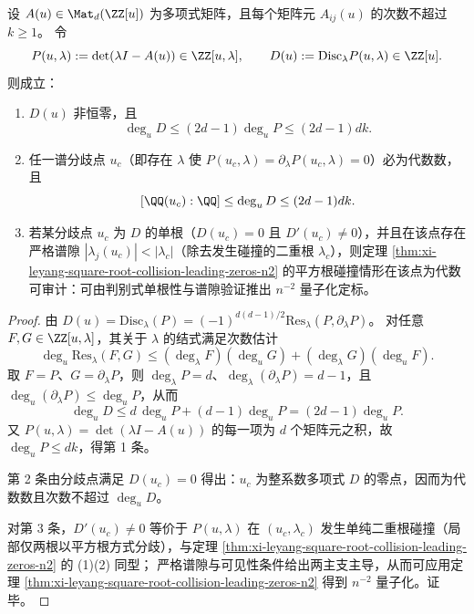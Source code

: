 \begin{theorem}[多项式传递矩阵的临界点代数性与判别式复杂度上界]\label{thm:xi-polynomial-transfer-matrix-branchpoint-discriminant-degree}
设 \(A(u)\in\Mat_d(\ZZ[u])\) 为多项式矩阵，且每个矩阵元 \(A_{ij}(u)\) 的次数不超过 \(k\ge 1\)。
令
\[
P(u,\lambda):=\det(\lambda I-A(u))\in\ZZ[u,\lambda],
\qquad
D(u):=\mathrm{Disc}_\lambda P(u,\lambda)\in\ZZ[u].
\]
则成立：
\begin{enumerate}
  \item \(D(u)\) 非恒零，且
  \[
  \deg_u D\le (2d-1)\deg_u P\le (2d-1)dk.
  \]
  \item 任一谱分歧点 \(u_c\)（即存在 \(\lambda\) 使 \(P(u_c,\lambda)=\partial_\lambda P(u_c,\lambda)=0\)）必为代数数，且
  \[
  [\QQ(u_c):\QQ]\le \deg_u D \le (2d-1)dk.
  \]
  \item 若某分歧点 \(u_c\) 为 \(D\) 的单根（\(D(u_c)=0\) 且 \(D'(u_c)\neq 0\)），并且在该点存在严格谱隙 \(|\lambda_j(u_c)|<|\lambda_c|\)（除去发生碰撞的二重根 \(\lambda_c\)），则定理 \ref{thm:xi-leyang-square-root-collision-leading-zeros-n2} 的平方根碰撞情形在该点为代数可审计：可由判别式单根性与谱隙验证推出 \(n^{-2}\) 量子化定标。
\end{enumerate}
\end{theorem}
\begin{proof}
由 \(D(u)=\mathrm{Disc}_\lambda(P)=(-1)^{d(d-1)/2}\mathrm{Res}_\lambda(P,\partial_\lambda P)\)。
对任意 \(F,G\in\ZZ[u,\lambda]\)，其关于 \(\lambda\) 的结式满足次数估计
\[
\deg_u\mathrm{Res}_\lambda(F,G)
\le (\deg_\lambda F)(\deg_u G)+(\deg_\lambda G)(\deg_u F).
\]
取 \(F=P\)、\(G=\partial_\lambda P\)，则 \(\deg_\lambda P=d\)、\(\deg_\lambda(\partial_\lambda P)=d-1\)，且 \(\deg_u(\partial_\lambda P)\le \deg_u P\)，从而
\[
\deg_u D\le d\,\deg_u P+(d-1)\deg_u P=(2d-1)\deg_u P.
\]
又 \(P(u,\lambda)=\det(\lambda I-A(u))\) 的每一项为 \(d\) 个矩阵元之积，故 \(\deg_u P\le dk\)，得第 1 条。

第 2 条由分歧点满足 \(D(u_c)=0\) 得出：\(u_c\) 为整系数多项式 \(D\) 的零点，因而为代数数且次数不超过 \(\deg_u D\)。

对第 3 条，\(D'(u_c)\neq 0\) 等价于 \(P(u,\lambda)\) 在 \((u_c,\lambda_c)\) 发生单纯二重根碰撞（局部仅两根以平方根方式分歧），与定理 \ref{thm:xi-leyang-square-root-collision-leading-zeros-n2} 的 (1)(2) 同型；
严格谱隙与可见性条件给出两主支主导，从而可应用定理 \ref{thm:xi-leyang-square-root-collision-leading-zeros-n2} 得到 \(n^{-2}\) 量子化。证毕。
\end{proof}

